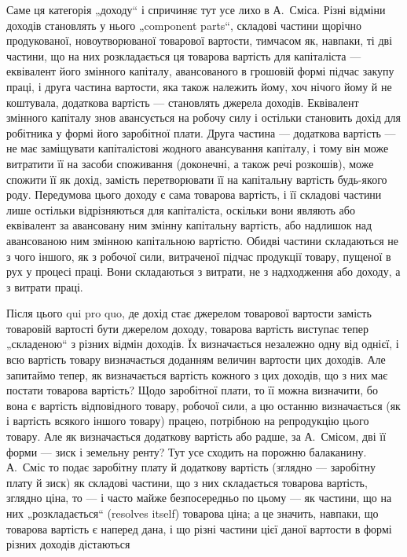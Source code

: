 Саме ця категорія „доходу“ і спричиняє тут усе лихо в А.~Сміса.
Різні відміни доходів становлять у нього „component parts“, складові
частини щорічно продукованої, новоутворюваної товарової вартости, тимчасом
як, навпаки, ті дві частини, що на них розкладається ця товарова
вартість для капіталіста — еквівалент його змінного капіталу, авансованого
в грошовій формі підчас закупу праці, і друга частина вартости, яка також
належить йому, хоч нічого йому й не коштувала, додаткова вартість —
становлять джерела доходів. Еквівалент змінного капіталу знов авансується
на робочу силу і остільки становить дохід для робітника у формі його
заробітної плати. Друга частина — додаткова вартість — не має заміщувати
капіталістові жодного авансування капіталу, і тому він може витратити її
на засоби споживання (доконечні, а також речі розкошів), може спожити її
як дохід, замість перетворювати її на капітальну вартість будь-якого роду.
Передумова цього доходу є сама товарова вартість, і її складові частини
лише остільки відрізняються для капіталіста, оскільки вони являють або
еквівалент за авансовану ним змінну капітальну вартість, або надлишок
над авансованою ним змінною капітальною вартістю. Обидві частини складаються
не з чого іншого, як з робочої сили, витраченої підчас продукції
товару, пущеної в рух у процесі праці. Вони складаються з витрати,
не з надходження або доходу, а з витрати праці.

Після цього qui pro quo, де дохід стає джерелом товарової вартости
замість товаровій вартості бути джерелом доходу, товарова
вартість виступає тепер „складеною“ з різних відмін доходів. Їх
визначається незалежно одну від однієї, і всю вартість товару визначається
доданням величин вартости цих доходів. Але запитаймо тепер,
як визначається вартість кожного з цих доходів, що з них має постати
товарова вартість? Щодо заробітної плати, то її можна визначити, бо вона
є вартість відповідного товару, робочої сили, а цю останню визначається
(як і вартість всякого іншого товару) працею, потрібною на репродукцію
цього товару. Але як визначається додаткову вартість або радше, за А.~Смісом, дві її форми — зиск і земельну ренту? Тут усе сходить на порожню
балаканину. А.~Сміс то подає заробітну плату й додаткову вартість
(зглядно — заробітну плату й зиск) як складові частини, що з них складається
товарова вартість, зглядно ціна, то — і часто майже безпосередньо
по цьому — як частини, що на них „розкладається“ (resolves itself) товарова
ціна; а це значить, навпаки, що товарова вартість є наперед дана,
і що різні частини цієї даної вартости в формі різних доходів дістаються
\parbreak{}  %
